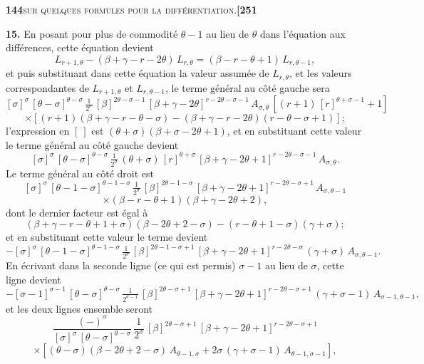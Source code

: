 \documentclass[11pt]{article}
\begin{document}
\newpage

\noindent\textbf{144}\hfill\textsc{sur quelques formules pour la différentiation.}\hfill\textbf{[251}

\medskip

\textbf{15.} En posant pour plus de commodité $\theta - 1$ au lieu de $\theta$ dans l'équation aux différences, cette équation devient
\[
L_{r+1,\theta} - (\beta + \gamma - r - 2\theta)\,L_{r,\theta} = (\beta - r - \theta + 1)\,L_{r,\theta-1},
\]
et puis substituant dans cette équation la valeur assumée de $L_{r,\theta}$, et les valeurs correspondantes de $L_{r+1,\theta}$ et $L_{r,\theta-1}$, le terme général au côté gauche sera
\[
[\sigma]^{\sigma}\,[\theta - \sigma]^{\theta-\sigma}\,\tfrac{1}{2^{\sigma}}\,[\beta]^{2\theta-\sigma-1}\,[\beta + \gamma - 2\theta]^{r-2\theta-\sigma-1}\,A_{\sigma,\theta}\,[(r+1)\,[r]^{\theta+\sigma-1} + 1]
\]
\[
\times [(r+1)(\beta + \gamma - r - \theta - \sigma) - (\beta + \gamma - r - 2\theta)(r - \theta - \sigma + 1)];
\]
l'expression en $[\ ]$ est $(\theta + \sigma)(\beta + \sigma - 2\theta + 1)$, et en substituant cette valeur le terme général au côté gauche devient
\[
[\sigma]^{\sigma}\,[\theta - \sigma]^{\theta-\sigma}\,\tfrac{1}{2^{\sigma}}\,(\theta + \sigma)\,[r]^{\theta+\sigma}\,[\beta + \gamma - 2\theta + 1]^{r-2\theta-\sigma-1}\,A_{\sigma,\theta}.
\]
Le terme général au côté droit est
\[
[\sigma]^{\sigma}\,[\theta - 1 - \sigma]^{\theta-1-\sigma}\,\tfrac{1}{2^{\sigma}}\,[\beta]^{2\theta-1-\sigma}\,[\beta + \gamma - 2\theta + 1]^{r-2\theta-\sigma+1}\,A_{\sigma,\theta-1}
\]
\[
\times (\beta - r - \theta + 1)(\beta + \gamma - 2\theta + 2),
\]
dont le dernier facteur est égal à
\[
(\beta + \gamma - r - \theta + 1 + \sigma)(\beta - 2\theta + 2 - \sigma) - (r - \theta + 1 - \sigma)(\gamma + \sigma);
\]
et en substituant cette valeur le terme devient
\[
-[\sigma]^{\sigma}\,[\theta - 1 - \sigma]^{\theta-1-\sigma}\,\tfrac{1}{2^{\sigma}}\,[\beta]^{2\theta-1-\sigma+1}\,[\beta + \gamma - 2\theta + 1]^{r-2\theta-\sigma}\,(\gamma + \sigma)\,A_{\sigma,\theta-1}.
\]
En écrivant dans la seconde ligne (ce qui est permis) $\sigma - 1$ au lieu de $\sigma$, cette ligne devient
\[
-[\sigma - 1]^{\sigma-1}\,[\theta - \sigma]^{\theta-\sigma}\,\tfrac{1}{2^{\sigma-1}}\,[\beta]^{2\theta-\sigma+1}\,[\beta + \gamma - 2\theta + 1]^{r-2\theta-\sigma+1}\,(\gamma + \sigma - 1)\,A_{\sigma-1,\theta-1},
\]
et les deux lignes ensemble seront
\[
\frac{(-)^{\sigma}}{[\sigma]^{\sigma}\,[\theta - \sigma]^{\theta-\sigma}}\,\frac{1}{2^{\sigma}}\,[\beta]^{2\theta-\sigma+1}\,[\beta + \gamma - 2\theta + 1]^{r-2\theta-\sigma+1}
\]
\[
\times [(\theta - \sigma)(\beta - 2\theta + 2 - \sigma)\,A_{\theta-1,\sigma} + 2\sigma\,(\gamma + \sigma - 1)\,A_{\theta-1,\sigma-1}],
\]
\end{document}
